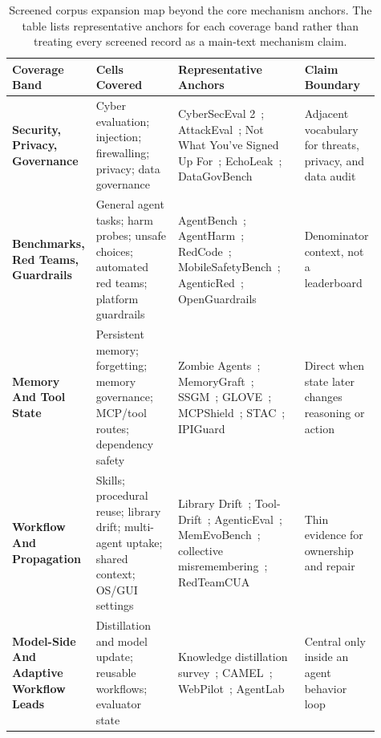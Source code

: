 \begin{table}[!htbp]
\caption{Screened corpus expansion map beyond the core mechanism anchors. The table lists representative anchors for each coverage band rather than treating every screened record as a main-text mechanism claim.}
\label{tab:screened-corpus-expansion}
\centering
\scriptsize
\setlength{\tabcolsep}{3.4pt}
\renewcommand{\arraystretch}{1.08}
\SAVERTableRows
\begin{tabular}{@{}>{\raggedright\arraybackslash}p{0.16\linewidth}>{\raggedright\arraybackslash}p{0.24\linewidth}>{\raggedright\arraybackslash}p{0.36\linewidth}>{\raggedright\arraybackslash}p{0.15\linewidth}@{}}
\toprule
\rowcolor{saverNeutralHead}
\textbf{Coverage Band} & \textbf{Cells Covered} & \textbf{Representative Anchors} & \textbf{Claim Boundary} \\
\midrule
\textbf{Security, Privacy, Governance} & Cyber evaluation; injection; firewalling; privacy; data governance & CyberSecEval 2~\cite{bhatt_2024_cyberseceval_2_a_wide_rangin}; AttackEval~\cite{shu_2025_attackeval_how_to_evaluate_t}; Not What You've Signed Up For~\cite{greshake_2023_not_what_you_ve_signed_up_fo}; EchoLeak~\cite{reddy_2025_echoleak_the_first_real_worl}; DataGovBench~\cite{zhou_2025_datagovbench_benchmarking_ll} & Adjacent vocabulary for threats, privacy, and data audit \\
\textbf{Benchmarks, Red Teams, Guardrails} & General agent tasks; harm probes; unsafe choices; automated red teams; platform guardrails & AgentBench~\cite{liu_2023_agentbench_evaluating_llms_a}; AgentHarm~\cite{andriushchenko2025agentharm}; RedCode~\cite{guo2024redcode}; MobileSafetyBench~\cite{lee2026mobilesafetybench}; AgenticRed~\cite{yuan2026agenticred}; OpenGuardrails~\cite{wang2025openguardrails} & Denominator context, not a leaderboard \\
\textbf{Memory And Tool State} & Persistent memory; forgetting; memory governance; MCP/tool routes; dependency safety & Zombie Agents~\cite{yang2026zombie_agents}; MemoryGraft~\cite{srivastava2025memorygraft}; SSGM~\cite{lam2026ssgm}; GLOVE~\cite{yin2026glove}; MCPShield~\cite{zhou2026mcpshield}; STAC~\cite{li2026stac}; IPIGuard~\cite{an2025ipiguard} & Direct when state later changes reasoning or action \\
\textbf{Workflow And Propagation} & Skills; procedural reuse; library drift; multi-agent uptake; shared context; OS/GUI settings & Library Drift~\cite{zhang2026library_drift}; Tool-Drift~\cite{dabas2026tool_drift}; AgenticEval~\cite{wang2026agenticeval}; MemEvoBench~\cite{xie2026memevobench}; collective misremembering~\cite{xu2026when}; RedTeamCUA~\cite{liao2026redteamcua} & Thin evidence for ownership and repair \\
\textbf{Model-Side And Adaptive Workflow Leads} & Distillation and model update; reusable workflows; evaluator state & Knowledge distillation survey~\cite{xu_2024_a_survey_on_knowledge_distil}; CAMEL~\cite{li_2023_camel_communicative_agents_f}; WebPilot~\cite{zhang_2025_webpilot_a_versatile_and_aut}; AgentLab~\cite{jiang_2026_agentlab} & Central only inside an agent behavior loop \\
\bottomrule
\end{tabular}
\SAVERTableReset
\end{table}
